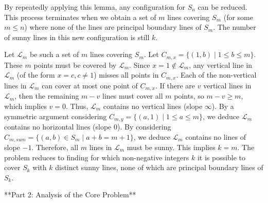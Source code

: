 By repeatedly applying this lemma, any configuration for $S_n$ can be reduced. This process terminates when we obtain a set of $m$ lines covering $S_m$ (for some $m \le n$) where none of the lines are principal boundary lines of $S_m$. The number of sunny lines in this new configuration is still $k$.

Let $\mathcal{L}_m$ be such a set of $m$ lines covering $S_m$.
Let $C_{m,x} = \{(1,b) \mid 1 \le b \le m\}$. These $m$ points must be covered by $\mathcal{L}_m$. Since $x=1 \notin \mathcal{L}_m$, any vertical line in $\mathcal{L}_m$ (of the form $x=c, c \ne 1$) misses all points in $C_{m,x}$. Each of the non-vertical lines in $\mathcal{L}_m$ can cover at most one point of $C_{m,x}$. If there are $v$ vertical lines in $\mathcal{L}_m$, then the remaining $m-v$ lines must cover all $m$ points, so $m-v \ge m$, which implies $v=0$. Thus, $\mathcal{L}_m$ contains no vertical lines (slope $\infty$).
By a symmetric argument considering $C_{m,y} = \{(a,1) \mid 1 \le a \le m\}$, we deduce $\mathcal{L}_m$ contains no horizontal lines (slope $0$).
By considering $C_{m,sum} = \{(a,b) \in S_m \mid a+b=m+1\}$, we deduce $\mathcal{L}_m$ contains no lines of slope $-1$.
Therefore, all $m$ lines in $\mathcal{L}_m$ must be sunny. This implies $k=m$. The problem reduces to finding for which non-negative integers $k$ it is possible to cover $S_k$ with $k$ distinct sunny lines, none of which are principal boundary lines of $S_k$.

**Part 2: Analysis of the Core Problem**

